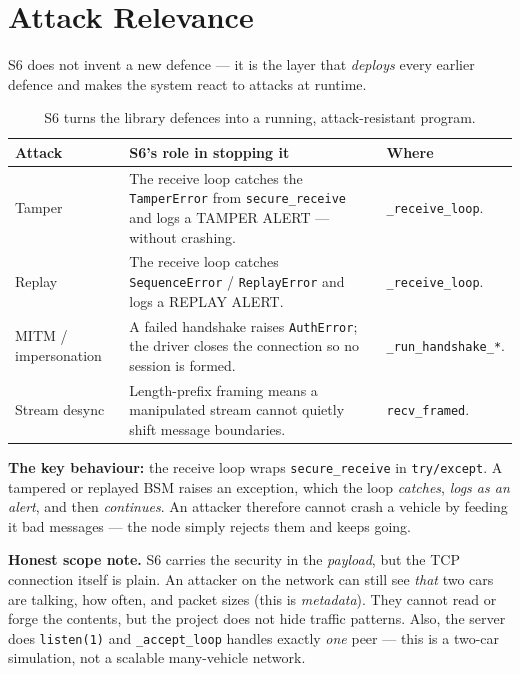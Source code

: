 \documentclass[11pt,a4paper]{report}
\begin{document}
\section{Attack Relevance}

S6 does not invent a new defence --- it is the layer that \emph{deploys} every
earlier defence and makes the system react to attacks at runtime.

\begin{table}[h]
\centering
\small
\begin{tabular}{@{}p{2.7cm} p{5.8cm} p{5.0cm}@{}}
\toprule
\textbf{Attack} & \textbf{S6's role in stopping it} & \textbf{Where}\\
\midrule
Tamper & The receive loop catches the \texttt{TamperError} from
\texttt{secure\_receive} and logs a TAMPER ALERT --- without crashing. &
\texttt{\_receive\_loop}.\\
Replay & The receive loop catches \texttt{SequenceError} /
\texttt{ReplayError} and logs a REPLAY ALERT. & \texttt{\_receive\_loop}.\\
MITM / impersonation & A failed handshake raises \texttt{AuthError}; the driver
closes the connection so no session is formed. & \texttt{\_run\_handshake\_*}.\\
Stream desync & Length-prefix framing means a manipulated stream cannot quietly
shift message boundaries. & \texttt{recv\_framed}.\\
\bottomrule
\end{tabular}
\caption{S6 turns the library defences into a running, attack-resistant program.}
\end{table}

\noindent\textbf{The key behaviour:} the receive loop wraps
\texttt{secure\_receive} in \texttt{try/except}. A tampered or replayed BSM
raises an exception, which the loop \emph{catches}, \emph{logs as an alert}, and
then \emph{continues}. An attacker therefore cannot crash a vehicle by feeding it
bad messages --- the node simply rejects them and keeps going.

\textbf{Honest scope note.} S6 carries the security in the \emph{payload}, but
the TCP connection itself is plain. An attacker on the network can still see
\emph{that} two cars are talking, how often, and packet sizes (this is
\emph{metadata}). They cannot read or forge the contents, but the project does
not hide traffic patterns. Also, the server does \texttt{listen(1)} and
\texttt{\_accept\_loop} handles exactly \emph{one} peer --- this is a two-car
simulation, not a scalable many-vehicle network.
\end{document}
